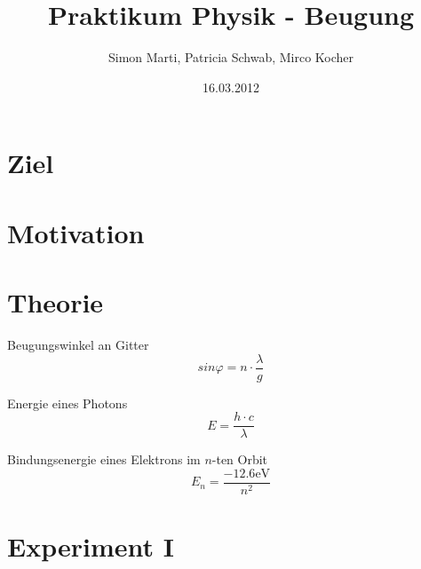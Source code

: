 \documentclass[12pt,a4paper]{article}
\title{Praktikum Physik - Beugung}
\author{Simon Marti, Patricia Schwab, Mirco Kocher}
\date{16.03.2012}
\begin{document}
\maketitle

\section*{Ziel}

\section*{Motivation}

\section*{Theorie}
Beugungswinkel an Gitter
\begin{equation}
sin\varphi = n\cdot \frac{\lambda}{g}
\end{equation}

Energie eines Photons
\begin{equation}
E = \frac{h\cdot c}{\lambda}
\end{equation}

Bindungsenergie eines Elektrons im $n$-ten Orbit
\begin{equation}
E_n = \frac{-12.6\mbox{eV}}{n^2}
\end{equation}

\section*{Experiment I}

\end{document}
